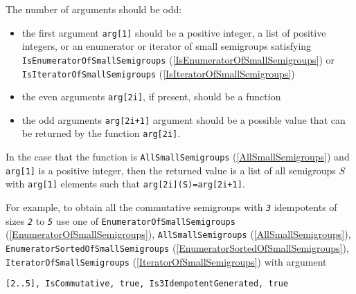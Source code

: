 \documentclass[a4paper,11pt]{report}
\begin{document}
{{ The number of arguments should be odd: 
\begin{itemize}
\item the first argument \texttt{arg[1]} should be a positive integer, a list of positive integers, or an enumerator or
iterator of small semigroups satisfying \texttt{IsEnumeratorOfSmallSemigroups} (\ref{IsEnumeratorOfSmallSemigroups}) or \texttt{IsIteratorOfSmallSemigroups} (\ref{IsIteratorOfSmallSemigroups})
\item  the even arguments \texttt{arg[2i]}, if present, should be a function
\item  the odd arguments \texttt{arg[2i+1]} argument should be a possible value that can be returned by the function \texttt{arg[2i]}.
\end{itemize}
 In the case that the function is \texttt{AllSmallSemigroups} (\ref{AllSmallSemigroups}) and \texttt{arg[1]} is a positive integer, then the returned value is a list of all semigroups $S$ with \texttt{arg[1]} elements such that \texttt{arg[2i](S)=arg[2i+1]}.

 For example, to obtain all the commutative semigroups with \mbox{\texttt{\slshape 3}} idempotents of sizes \mbox{\texttt{\slshape 2}} to \mbox{\texttt{\slshape 5}} use one of \texttt{EnumeratorOfSmallSemigroups} (\ref{EnumeratorOfSmallSemigroups}), \texttt{AllSmallSemigroups} (\ref{AllSmallSemigroups}), \texttt{EnumeratorSortedOfSmallSemigroups} (\ref{EnumeratorSortedOfSmallSemigroups}), \texttt{IteratorOfSmallSemigroups} (\ref{IteratorOfSmallSemigroups}) with argument 
\begin{Verbatim}[fontsize=\small,frame=single,label=Example]
  [2..5], IsCommutative, true, Is3IdempotentGenerated, true
  	

\end{Verbatim}}}
\end{document}

